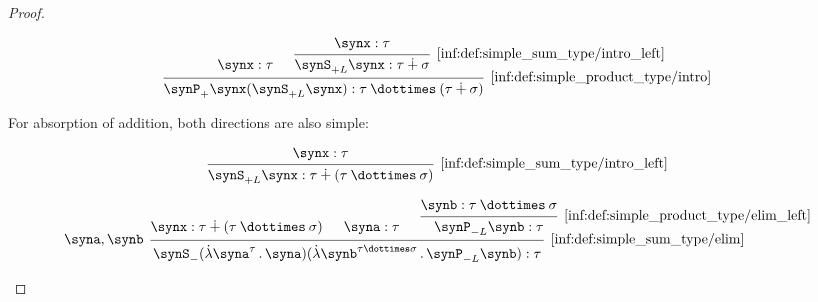 \begin{proof}
\begin{paracol}{2}
    \begin{rightcolumn}
      \ParacolAlignmentHack
      \begin{equation*}
        \begin{prooftree}
          \hypo{ \synx: \tau }

          \hypo{ \synx: \tau }
          \infer1[\ref{inf:def:simple_sum_type/intro_left}]{ \synS_{+L} \synx: \tau \synplus \sigma }

          \infer2[\ref{inf:def:simple_product_type/intro}]{ \synP_+ \synx (\synS_{+L} \synx): \tau \syntimes (\tau \synplus \sigma) }
        \end{prooftree}
      \end{equation*}
    \end{rightcolumn}
  \end{paracol}

   For absorption of addition, both directions are also simple:
  \begin{paracol}{2}
    \begin{leftcolumn}
      \ParacolAlignmentHack
      \begin{equation*}
        \begin{prooftree}
          \hypo{ \synx: \tau }
          \infer1[\ref{inf:def:simple_sum_type/intro_left}]{ \synS_{+L} \synx: \tau \synplus (\tau \syntimes \sigma) }
        \end{prooftree}
      \end{equation*}
    \end{leftcolumn}

    \begin{rightcolumn}
      \ParacolAlignmentHack
      \begin{equation*}
        \begin{prooftree}
          \hypo{ \synx: \tau \synplus (\tau \syntimes \sigma) }

          \hypo{ \syna: \tau }

          \hypo{ \synb: \tau \syntimes \sigma }
          \infer1[\ref{inf:def:simple_product_type/elim_left}]{ \synP_{-L} \synb: \tau }

          \infer[left label={\( \syna, \synb \)}]3[\ref{inf:def:simple_sum_type/elim}]{ \synS_- (\qabs {\syna^\tau} \syna) (\qabs {\synb^{\tau \syntimes \sigma}} \synP_{-L} \synb): \tau }
        \end{prooftree}
      \end{equation*}
    \end{rightcolumn}
  \end{paracol}
  \columnratio{}
\end{proof}
